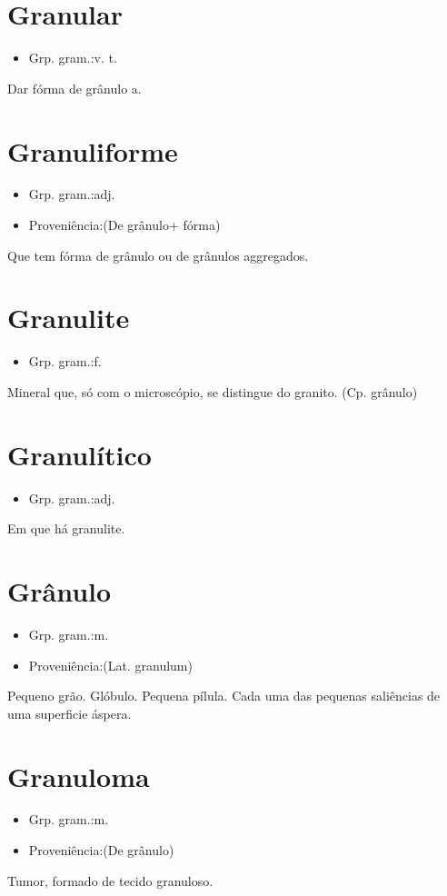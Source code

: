 \section{Granular}
\begin{itemize}
\item {Grp. gram.:v. t.}
\end{itemize}
Dar fórma de grânulo a.
\section{Granuliforme}
\begin{itemize}
\item {Grp. gram.:adj.}
\end{itemize}
\begin{itemize}
\item {Proveniência:(De \textunderscore grânulo\textunderscore  + \textunderscore fórma\textunderscore )}
\end{itemize}
Que tem fórma de grânulo ou de grânulos aggregados.
\section{Granulite}
\begin{itemize}
\item {Grp. gram.:f.}
\end{itemize}
Mineral que, só com o microscópio, se distingue do granito.
(Cp. \textunderscore grânulo\textunderscore )
\section{Granulítico}
\begin{itemize}
\item {Grp. gram.:adj.}
\end{itemize}
Em que há granulite.
\section{Grânulo}
\begin{itemize}
\item {Grp. gram.:m.}
\end{itemize}
\begin{itemize}
\item {Proveniência:(Lat. \textunderscore granulum\textunderscore )}
\end{itemize}
Pequeno grão.
Glóbulo.
Pequena pílula.
Cada uma das pequenas saliências de uma superficie áspera.
\section{Granuloma}
\begin{itemize}
\item {Grp. gram.:m.}
\end{itemize}
\begin{itemize}
\item {Proveniência:(De \textunderscore grânulo\textunderscore )}
\end{itemize}
Tumor, formado de tecido granuloso.
